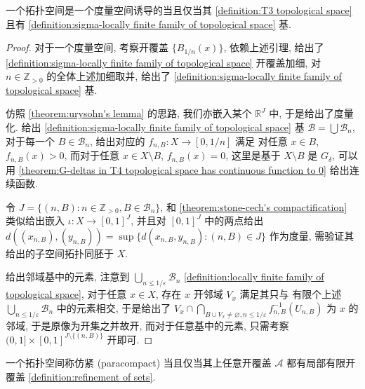 \begin{theorem}
    \label {theorem:nagata-smirnov's metrization theorem}
    一个拓扑空间是一个度量空间诱导的当且仅当其 \ref{definition:T3 topological space} 且有 \ref{definition:sigma-locally finite family of topological space} 基.

    \begin{proof}
        对于一个度量空间, 考察开覆盖 \(\{B_{1/n} (x)\}\), 依赖上述引理, 给出了 \ref{definition:sigma-locally finite family of topological space} 开覆盖加细,
        对 \(n \in \mathbb{Z}_{>0}\) 的全体上述加细取并, 给出了 \ref{definition:sigma-locally finite family of topological space} 基.

        仿照 \ref{theorem:urysohn's lemma} 的思路, 我们亦嵌入某个 \(\mathbb{R}^J\) 中, 于是给出了度量化. 给出 \ref{definition:sigma-locally finite family of topological space}
        基 \(\mathcal{B} = \bigcup \mathcal{B}_n\), 对于每一个 \(B \in \mathcal{B}_n\), 给出对应的 \(f_{n,B} : X \to [0,1/n]\) 满足 对任意 \(x \in B\), \(f_{n,B} (x) > 0\),
        而对于任意 \(x \in X \setminus B\), \(f_{n,B} (x) = 0\), 这里是基于 \(X \setminus B\) 是 \(G_\delta\), 可以用 \ref{theorem:G-deltas in T4 topological space has continuous function to 0} 给出连续函数.

        令 \(J = \{(n,B) : n \in \mathbb{Z}_{>0}, B \in \mathcal{B}_n\}\), 和 \ref{theorem:stone-cech's compactification} 类似给出嵌入
        \(\iota : X \to [0,1]^J\), 并且对 \([0,1]^J\) 中的两点给出 \(d ((x_{n,B}), (y_{n,B})) = \sup \{d (x_{n,B}, y_{n,B}) : (n,B) \in J\}\)
        作为度量, 需验证其给出的子空间拓扑同胚于 \(X\).

        给出邻域基中的元素, 注意到 \(\bigcup_{n \leq 1/\varepsilon} \mathcal{B}_n\) \ref{definition:locally finite family of topological space}, 对于任意 \(x \in X\), 存在 \(x\) 开邻域 \(V_x\) 满足其只与
        有限个上述 \(\bigcup_{n \leq 1/\varepsilon} \mathcal{B}_n\) 中的元素相交, 于是给出了 \(V_x \cap \bigcap_{B \cup V_x \neq \varnothing, n \leq 1/\varepsilon} f_{n,B}^{-1} (U_{n,B})\) 为 \(x\) 的邻域,
        于是原像为开集之并故开, 而对于任意基中的元素, 只需考察 \((0,1] \times [0,1]^{J \setminus \{(n,B)\}}\) 开即可.
    \end{proof}
\end{theorem}

\begin{definition}[仿紧]
    \label {definition:paracompact topological space}
    一个拓扑空间称仿紧 (paracompact) 当且仅当其上任意开覆盖 \(\mathcal{A}\) 都有局部有限开覆盖 \ref{definition:refinement of sets}.
\end{definition}


